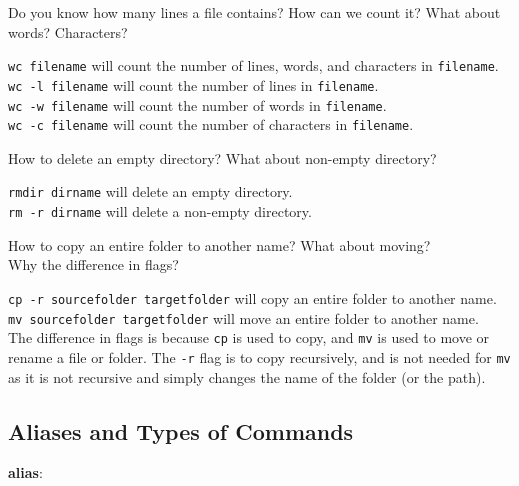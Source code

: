 \begin{qs}
  Do you know how many lines a file contains? How can we count it?
  What about words? Characters?
\end{qs}

\begin{ans}
  \texttt{wc filename} will count the number of lines, words, and characters in \texttt{filename}. \\
  \texttt{wc -l filename} will count the number of lines in \texttt{filename}. \\
  \texttt{wc -w filename} will count the number of words in \texttt{filename}. \\
  \texttt{wc -c filename} will count the number of characters in \texttt{filename}.
\end{ans}

\begin{qs}
  How to delete an empty directory? What about non-empty directory?
\end{qs}

\begin{ans}
  \texttt{rmdir dirname} will delete an empty directory. \\
  \texttt{rm -r dirname} will delete a non-empty directory.
\end{ans}

\begin{qs}
  How to copy an entire folder to another name? What about moving? \\
  Why the difference in flags?
\end{qs}

\begin{ans}
  \texttt{cp -r sourcefolder targetfolder} will copy an entire folder to another name. \\
  \texttt{mv sourcefolder targetfolder} will move an entire folder to another name. \\
  The difference in flags is because \texttt{cp} is used to copy, and \texttt{mv} is used to move or rename a file or folder.
  The \texttt{-r} flag is to copy recursively, and is not needed for \texttt{mv} as it is not recursive
  and simply changes the name of the folder (or the path).
\end{ans}

\subsection{Aliases and Types of Commands}

\textbf{alias}:

